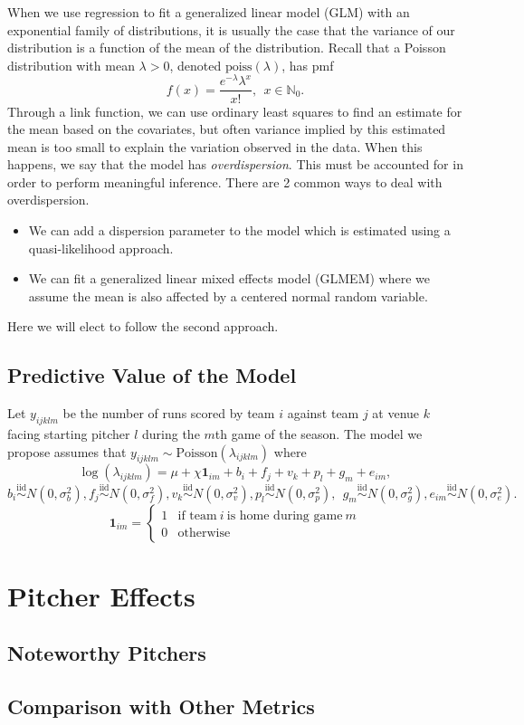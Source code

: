 \documentclass [52pt] {article}
\newcommand{\N}{\mathbb{N}}
\newcommand{\simiid}{\overset{\text{iid}}{\sim}}
\begin{document}
When we use regression to fit a generalized linear model (GLM) with an exponential family of distributions, it is usually the case that the variance of our distribution is a function of the mean of the distribution.  Recall that a Poisson distribution with mean $\lambda>0$, denoted $\text{poiss}(\lambda)$, has pmf
\[f(x) = \frac{e^{-\lambda}\lambda^x}{x!},\:\:x\in\N_0.\]
Through a link function, we can use ordinary least squares to find an estimate for the mean based on the covariates, but often variance implied by this estimated mean is too small to explain the variation observed in the data.  When this happens, we say that the model has \emph{overdispersion}.  This must be accounted for in order to perform meaningful inference.  There are 2 common ways to deal with overdispersion.
\begin{itemize}
\item We can add a dispersion parameter to the model which is estimated using a quasi-likelihood approach.
\item We can fit a generalized linear mixed effects model (GLMEM) where we assume the mean is also affected by a centered normal random variable. 
\end{itemize}
Here we will elect to follow the second approach.

\subsection{Predictive Value of the Model}
Let $y_{ijklm}$ be the number of runs scored by team $i$ against team $j$ at venue $k$ facing starting pitcher $l$ during the $m$th game of the season.  The model we propose assumes that $y_{ijklm}\sim\text{Poisson}(\lambda_{ijklm})$ where
\begin{equation}\label{eq : model1}
\log(\lambda_{ijklm}) = \mu + \chi \mathbf{1}_{im} + b_i + f_j + v_k + p_l + g_m + e_{im},
\end{equation}
\[b_i\simiid N(0,\sigma^2_b), f_j\simiid N(0,\sigma^2_f), v_k\simiid N(0,\sigma^2_v), p_l\simiid N(0, \sigma^2_p),\:\:g_m\simiid N(0, \sigma^2_g), e_{im}\simiid N(0,\sigma^2_e).\]
\[\mathbf{1}_{im} = \begin{cases}
1 & \text{if team}\:i\:\text{is home during game}\:m\\
0 &\text{otherwise}
\end{cases}\]


\section{Pitcher Effects}

\subsection{Noteworthy Pitchers}

\subsection{Comparison with Other Metrics}
\end{document}
